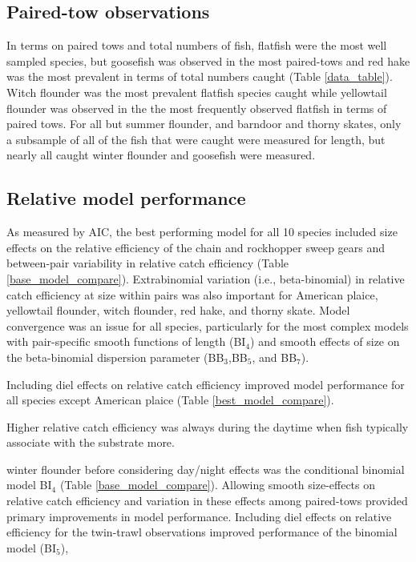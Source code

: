 \documentclass[]{article}
\begin{document}
\hypertarget{paired-tow-observations}{%
\subsection{Paired-tow observations}\label{paired-tow-observations}}

In terms on paired tows and total numbers of fish, flatfish were the
most well sampled species, but goosefish was observed in the most
paired-tows and red hake was the most prevalent in terms of total
numbers caught (Table \ref{data_table}). Witch flounder was the most
prevalent flatfish species caught while yellowtail flounder was observed
in the the most frequently observed flatfish in terms of paired tows.
For all but summer flounder, and barndoor and thorny skates, only a
subsample of all of the fish that were caught were measured for length,
but nearly all caught winter flounder and goosefish were measured.

\hypertarget{relative-model-performance}{%
\subsection{Relative model
performance}\label{relative-model-performance}}

As measured by AIC, the best performing model for all 10 species
included size effects on the relative efficiency of the chain and
rockhopper sweep gears and between-pair variability in relative catch
efficiency (Table \ref{base_model_compare}). Extrabinomial variation
(i.e., beta-binomial) in relative catch efficiency at size within pairs
was also important for American plaice, yellowtail flounder, witch
flounder, red hake, and thorny skate. Model convergence was an issue for
all species, particularly for the most complex models with pair-specific
smooth functions of length (BI\(_4\)) and smooth effects of size on the
beta-binomial dispersion parameter (BB\(_3\),BB\(_5\), and BB\(_7\)).

Including diel effects on relative catch efficiency improved model
performance for all species except American plaice (Table
\ref{best_model_compare}).

Higher relative catch efficiency was always during the daytime when fish
typically associate with the substrate more.

winter flounder before considering day/night effects was the conditional
binomial model BI\(_4\) (Table \ref{base_model_compare}). Allowing
smooth size-effects on relative catch efficiency and variation in these
effects among paired-tows provided primary improvements in model
performance. Including diel effects on relative efficiency for the
twin-trawl observations improved performance of the binomial model
(BI\(_5\)),
\end{document}
